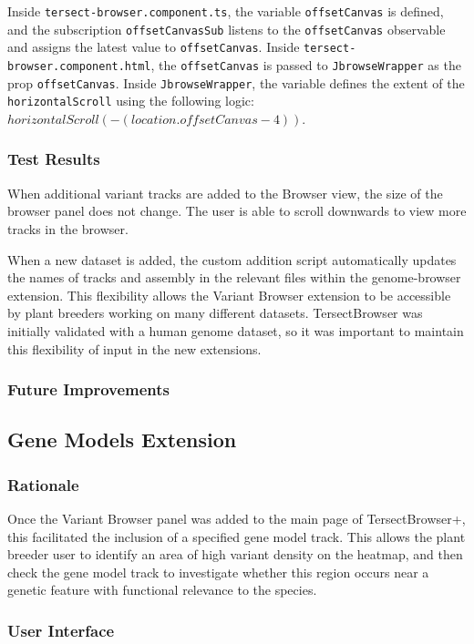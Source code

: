 \documentclass[12pt]{article}
\begin{document}
Inside \verb +tersect-browser.component.ts+, the variable \verb +offsetCanvas+ is defined, and the subscription \verb +offsetCanvasSub+ listens to the  \verb +offsetCanvas+ observable and assigns the latest value to \verb +offsetCanvas+. Inside \verb +tersect-browser.component.html+, the \verb +offsetCanvas+ is passed to \verb +JbrowseWrapper+ as the prop \verb +offsetCanvas+. Inside \verb +JbrowseWrapper+, the variable defines the extent of the \verb +horizontalScroll+ using the following logic: $horizontalScroll(-(location.offsetCanvas - 4))$. 


\subsubsection{Test Results}
When additional variant tracks are added to the Browser view, the size of the browser panel does not change. The user is able to scroll downwards to view more tracks in the browser. 

When a new dataset is added, the custom addition script automatically updates the names of tracks and assembly in the relevant files within the genome-browser extension. This flexibility allows the Variant Browser extension to be accessible by plant breeders working on many different datasets. TersectBrowser was initially validated with a human genome dataset, so it was important to maintain this flexibility of input in the new extensions.

\subsubsection{Future Improvements}

\subsection{Gene Models Extension}
\label{sec:Models}
\subsubsection{Rationale}
Once the Variant Browser panel was added to the main page of TersectBrowser+, this facilitated the inclusion of a specified gene model track. This allows the plant breeder user to identify an area of high variant density on the heatmap, and then check the gene model track to investigate whether this region occurs near a genetic feature with functional relevance to the species.

\subsubsection{User Interface}
\end{document}
